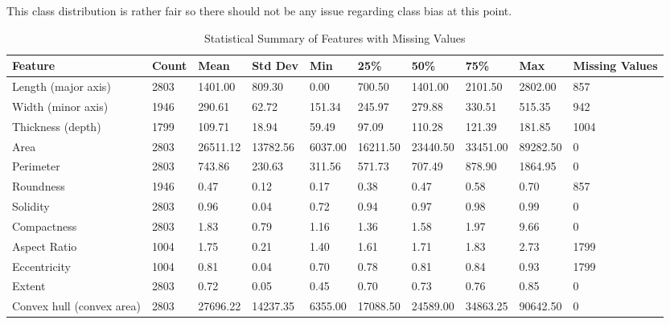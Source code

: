 \documentclass[conference]{IEEEtran}
\begin{document}
This class distribution is rather fair so there should not be any issue regarding class bias at this point.
\begin{table*}[h]
    \centering
    \caption{Statistical Summary of Features with Missing Values}
    \label{tab:dataset_stats}
    \begin{tabularx}{\textwidth}{@{}lXXXXXXXXX@{}}
        \toprule
        Feature & Count & Mean & Std Dev & Min & 25\% & 50\% & 75\% & Max & Missing Values \\ 
        \midrule
        Length (major axis)        & 2803   & 1401.00   & 809.30   & 0.00      & 700.50     & 1401.00   & 2101.50   & 2802.00 & 857 \\
        Width (minor axis)        & 1946   & 290.61    & 62.72    & 151.34    & 245.97    & 279.88    & 330.51    & 515.35 & 942 \\
        Thickness (depth)         & 1799   & 109.71    & 18.94    & 59.49     & 97.09     & 110.28    & 121.39    & 181.85 & 1004 \\
        Area                       & 2803   & 26511.12  & 13782.56 & 6037.00   & 16211.50  & 23440.50  & 33451.00  & 89282.50 & 0 \\
        Perimeter                  & 2803   & 743.86    & 230.63   & 311.56    & 571.73    & 707.49    & 878.90    & 1864.95 & 0 \\
        Roundness                  & 1946   & 0.47      & 0.12     & 0.17      & 0.38      & 0.47      & 0.58      & 0.70 & 857 \\
        Solidity                   & 2803   & 0.96      & 0.04     & 0.72      & 0.94      & 0.97      & 0.98      & 0.99 & 0 \\
        Compactness                & 2803   & 1.83      & 0.79     & 1.16      & 1.36      & 1.58      & 1.97      & 9.66 & 0 \\
        Aspect Ratio               & 1004   & 1.75      & 0.21     & 1.40      & 1.61      & 1.71      & 1.83      & 2.73 & 1799 \\
        Eccentricity               & 1004   & 0.81      & 0.04     & 0.70      & 0.78      & 0.81      & 0.84      & 0.93 & 1799 \\
        Extent                     & 2803   & 0.72      & 0.05     & 0.45      & 0.70      & 0.73      & 0.76      & 0.85 & 0 \\
        Convex hull (convex area) & 2803   & 27696.22  & 14237.35 & 6355.00   & 17088.50  & 24589.00  & 34863.25  & 90642.50 & 0 \\ 
        \bottomrule
    \end{tabularx}
\end{table*}
\end{document}
